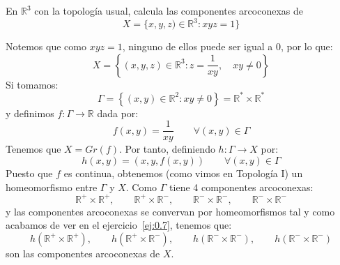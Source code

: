 \begin{ejercicio}
    En $\mathbb{R}^3$ con la topología usual, calcula las componentes arcoconexas de
    \begin{equation*}
        X = \{x,y,z) \in \mathbb{R}^3 : xyz = 1\}
    \end{equation*}

    \noindent
    Notemos que como $xyz = 1$, ninguno de ellos puede ser igual a 0, por lo que:
    \begin{equation*}
        X = \left\{(x,y,z)\in \mathbb{R}^3 : z=\dfrac{1}{xy} ,\quad  xy\neq 0\right\}
    \end{equation*}
    Si tomamos:
    \begin{equation*}
        \Gamma = \left\{(x,y) \in \mathbb{R}^2 : xy \neq 0\right\} = \mathbb{R}^\ast \times \mathbb{R}^\ast
    \end{equation*}
    y definimos $f:\Gamma\to \mathbb{R}$ dada por:
    \begin{equation*}
        f(x,y) = \dfrac{1}{xy} \qquad \forall (x,y)\in \Gamma
    \end{equation*}
    Tenemos que $X = Gr(f)$. Por tanto, definiendo $h:\Gamma\to X$ por:
    \begin{equation*}
        h(x,y) = (x,y,f(x,y)) \qquad \forall (x,y)\in \Gamma
    \end{equation*}
    Puesto que $f$ es continua, obtenemos (como vimos en Topología I) un homeomorfismo entre $\Gamma$ y $X$. Como $\Gamma$ tiene 4 componentes arcoconexas:
    \begin{equation*}
        \mathbb{R}^+\times \mathbb{R}^+, \qquad \mathbb{R}^+\times \mathbb{R}^-, \qquad \mathbb{R}^-\times\mathbb{R}^-, \qquad \mathbb{R}^-\times\mathbb{R}^-
    \end{equation*}
    y las componentes arcoconexas se convervan por homeomorfismos tal y como acabamos de ver en el ejercicio~\ref{ej:0.7}, tenemos que:
    \begin{equation*}
        h(\mathbb{R}^+\times \mathbb{R}^+), \qquad h(\mathbb{R}^+\times \mathbb{R}^-), \qquad h(\mathbb{R}^-\times\mathbb{R}^-), \qquad h(\mathbb{R}^-\times\mathbb{R}^-)
    \end{equation*}
    son las componentes arcoconexas de $X$.
\end{ejercicio}

